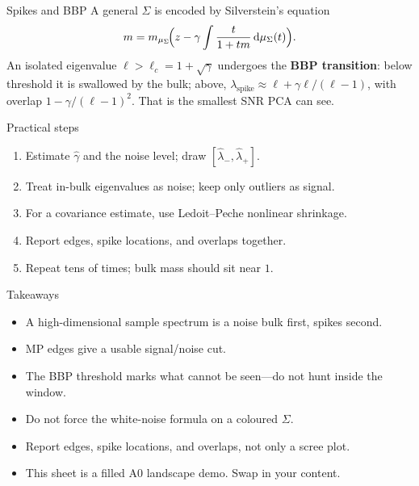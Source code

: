 \documentclass{article}
\begin{document}
\begin{postercolumns}
\begin{postercolumn}
\posterblockgap

\begin{posterblock}{Spikes and BBP}
  A general $\Sigma$ is encoded by Silverstein's equation
  \[
    m=m_{\mu_\Sigma}\!\Bigl(z-\gamma\int\frac{t}{1+tm}\,\mathrm{d}\mu_\Sigma(t)\Bigr).
  \]
  An isolated eigenvalue $\ell>\ell_c=1+\sqrt{\gamma}$ undergoes the
  \textbf{BBP transition}: below threshold it is swallowed by the bulk; above,
  $\lambda_{\mathrm{spike}}\approx \ell+\gamma\ell/(\ell-1)$,
  with overlap $1-\gamma/(\ell-1)^2$.
  That is the smallest SNR PCA can see.
\end{posterblock}
\end{postercolumn}

\begin{postercolumn}

\begin{posterblock}{Practical steps}
  \begin{enumerate}
    \item Estimate $\hat\gamma$ and the noise level; draw $[\hat\lambda_-,\hat\lambda_+]$.
    \item Treat in-bulk eigenvalues as noise; keep only outliers as signal.
    \item For a covariance estimate, use Ledoit--Peche nonlinear shrinkage.
    \item Report edges, spike locations, and overlaps together.
    \item Repeat tens of times; bulk mass should sit near $1$.
  \end{enumerate}
\end{posterblock}

\posterblockgap

\begin{posterblock}[posterfeature]{Takeaways}
  \begin{itemize}
    \item A high-dimensional sample spectrum is a noise bulk first, spikes second.
    \item MP edges give a usable signal/noise cut.
    \item The BBP threshold marks what cannot be seen---do not hunt inside the window.
    \item Do not force the white-noise formula on a coloured $\Sigma$.
    \item Report edges, spike locations, and overlaps, not only a scree plot.
    \item This sheet is a filled A0 landscape demo. Swap in your content.
  \end{itemize}
\end{posterblock}


\end{postercolumn}
\end{postercolumns}
\end{document}
